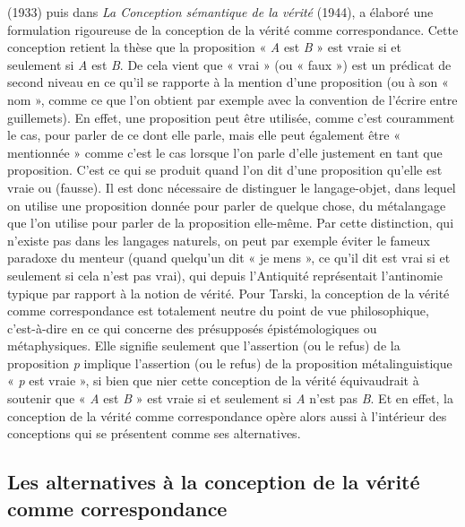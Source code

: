 (1933) puis dans {\it La Conception
sémantique de la vérité} (1944), a élaboré
une formulation rigoureuse de la conception
de la vérité comme correspondance.
Cette conception retient la thèse que la
proposition « {\it A} est {\it B} » est vraie si et seulement
si {\it A} est {\it B}. De cela vient que
« vrai » (ou « faux ») est un prédicat de
second niveau en ce qu’il se rapporte à la
mention d’une proposition (ou à son
« nom », comme ce que l’on obtient par
exemple avec la convention de l'écrire
entre guillemets). En effet, une proposition
peut être utilisée, comme c’est couramment
le cas, pour parler de ce dont
elle parle, mais elle peut également être
« mentionnée » comme c’est le cas lorsque
l’on parle d’elle justement en tant que
proposition. C’est ce qui se produit quand
l’on dit d’une proposition qu’elle est vraie
ou (fausse). Il est donc nécessaire de distinguer
le langage-objet, dans lequel on
utilise une proposition donnée pour parler
de quelque chose, du métalangage que
l’on utilise pour parler de la proposition
elle-même. Par cette distinction, qui
n'existe pas dans les langages naturels, on
peut par exemple éviter le fameux paradoxe
du menteur (quand quelqu'un dit
« je mens », ce qu’il dit est vrai si et seulement
si cela n’est pas vrai), qui depuis
l'Antiquité représentait  l’antinomie
typique par rapport à la notion de vérité.
Pour Tarski, la conception de la vérité
comme correspondance est totalement
neutre du point de vue philosophique,
c’est-à-dire en ce qui concerne des présupposés
épistémologiques ou métaphysiques.
Elle signifie seulement que
l’assertion (ou le refus) de la proposition
{\it p} implique l’assertion (ou le refus) de la
proposition métalinguistique « {\it p} est
vraie », si bien que nier cette conception
de la vérité équivaudrait à soutenir que
« {\it A} est {\it B} » est vraie si et seulement si {\it A}
n’est pas {\it B}. Et en effet, la conception de
la vérité comme correspondance opère
alors aussi à l’intérieur des conceptions
qui se présentent comme ses alternatives.

\subsection{Les alternatives à la conception
de la vérité comme correspondance}


